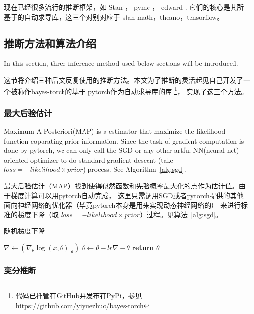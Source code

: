 \documentclass{article}
\begin{document}
现在已经很多流行的推断框架，如 Stan \cite{carpenter2017stan}，
pymc\cite{patil2010pymc} ， edward \cite{tran2016edward}. 
它们的核心是其所基于的自动求导库，这三个对别对应于 stan-math，theano，tensorflow。


\subsection{推断方法和算法介绍}

In this section, three inference method used below sections will be introduced.

这节将介绍三种后文反复使用的推断方法。本文为了推断的灵活起见自己开发了一个被称作bayes-torch的基于
pytorch作为自动求导库的库
\footnote{代码已托管在GitHub并发布在PyPi，参见\url{https://github.com/yiyuezhuo/bayes-torch}}，
实现了这三个方法。

\subsubsection{最大后验估计}

Maximum A Posteriori(MAP) is a estimator that maximize the likelihood function 
coporating prior information. Since the task of gradient computation is done by pytorch, 
we can only call the SGD or any other artful NN(neural net)-oriented optimizer to do standard gradient 
descent (take $loss = -likelihood \times prior$) process. See Algorithm~\ref{alg:sgd}.

最大后验估计（MAP）找到使得似然函数和先验概率最大化的点作为估计值。由于梯度计算可以用pytorch自动完成，
这里只需调用SGD或者pytorch提供的其他面向神经网络的优化器（毕竟pytorch本身是用来实现动态神经网络的）
来进行标准的梯度下降（取 $loss = -likelihood \times prior$）过程。见算法~\ref{alg:sgd}。

\begin{algorithm}
\caption{随机梯度下降}
\begin{algorithmic}[1]
 
        \State $\nabla \gets (\nabla_\theta \log(x,\theta)|_{\theta})$
        \State $\theta \gets \theta - lr \nabla -\theta$
    \EndFor
    \State \textbf{return} $\theta$
\EndProcedure
\end{algorithmic}
\label{alg:sgd}
\end{algorithm}

\subsubsection{变分推断}
\end{document}
